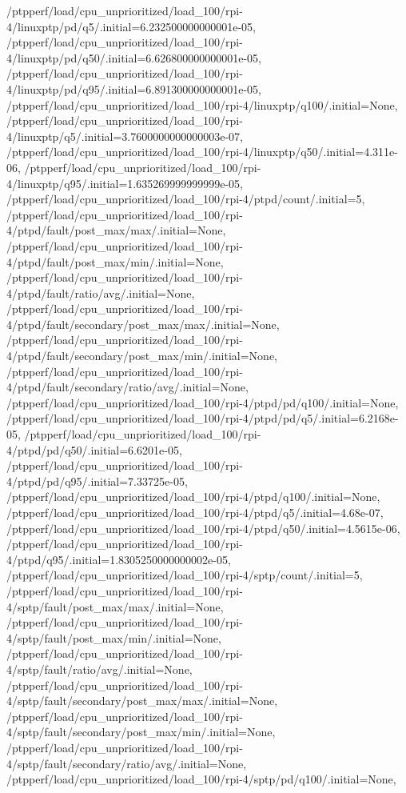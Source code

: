 {    /ptpperf/load/cpu_unprioritized/load_100/rpi-4/linuxptp/pd/q5/.initial=6.232500000000001e-05,
    /ptpperf/load/cpu_unprioritized/load_100/rpi-4/linuxptp/pd/q50/.initial=6.626800000000001e-05,
    /ptpperf/load/cpu_unprioritized/load_100/rpi-4/linuxptp/pd/q95/.initial=6.891300000000001e-05,
    /ptpperf/load/cpu_unprioritized/load_100/rpi-4/linuxptp/q100/.initial=None,
    /ptpperf/load/cpu_unprioritized/load_100/rpi-4/linuxptp/q5/.initial=3.7600000000000003e-07,
    /ptpperf/load/cpu_unprioritized/load_100/rpi-4/linuxptp/q50/.initial=4.311e-06,
    /ptpperf/load/cpu_unprioritized/load_100/rpi-4/linuxptp/q95/.initial=1.635269999999999e-05,
    /ptpperf/load/cpu_unprioritized/load_100/rpi-4/ptpd/count/.initial=5,
    /ptpperf/load/cpu_unprioritized/load_100/rpi-4/ptpd/fault/post_max/max/.initial=None,
    /ptpperf/load/cpu_unprioritized/load_100/rpi-4/ptpd/fault/post_max/min/.initial=None,
    /ptpperf/load/cpu_unprioritized/load_100/rpi-4/ptpd/fault/ratio/avg/.initial=None,
    /ptpperf/load/cpu_unprioritized/load_100/rpi-4/ptpd/fault/secondary/post_max/max/.initial=None,
    /ptpperf/load/cpu_unprioritized/load_100/rpi-4/ptpd/fault/secondary/post_max/min/.initial=None,
    /ptpperf/load/cpu_unprioritized/load_100/rpi-4/ptpd/fault/secondary/ratio/avg/.initial=None,
    /ptpperf/load/cpu_unprioritized/load_100/rpi-4/ptpd/pd/q100/.initial=None,
    /ptpperf/load/cpu_unprioritized/load_100/rpi-4/ptpd/pd/q5/.initial=6.2168e-05,
    /ptpperf/load/cpu_unprioritized/load_100/rpi-4/ptpd/pd/q50/.initial=6.6201e-05,
    /ptpperf/load/cpu_unprioritized/load_100/rpi-4/ptpd/pd/q95/.initial=7.33725e-05,
    /ptpperf/load/cpu_unprioritized/load_100/rpi-4/ptpd/q100/.initial=None,
    /ptpperf/load/cpu_unprioritized/load_100/rpi-4/ptpd/q5/.initial=4.68e-07,
    /ptpperf/load/cpu_unprioritized/load_100/rpi-4/ptpd/q50/.initial=4.5615e-06,
    /ptpperf/load/cpu_unprioritized/load_100/rpi-4/ptpd/q95/.initial=1.8305250000000002e-05,
    /ptpperf/load/cpu_unprioritized/load_100/rpi-4/sptp/count/.initial=5,
    /ptpperf/load/cpu_unprioritized/load_100/rpi-4/sptp/fault/post_max/max/.initial=None,
    /ptpperf/load/cpu_unprioritized/load_100/rpi-4/sptp/fault/post_max/min/.initial=None,
    /ptpperf/load/cpu_unprioritized/load_100/rpi-4/sptp/fault/ratio/avg/.initial=None,
    /ptpperf/load/cpu_unprioritized/load_100/rpi-4/sptp/fault/secondary/post_max/max/.initial=None,
    /ptpperf/load/cpu_unprioritized/load_100/rpi-4/sptp/fault/secondary/post_max/min/.initial=None,
    /ptpperf/load/cpu_unprioritized/load_100/rpi-4/sptp/fault/secondary/ratio/avg/.initial=None,
    /ptpperf/load/cpu_unprioritized/load_100/rpi-4/sptp/pd/q100/.initial=None,
}
